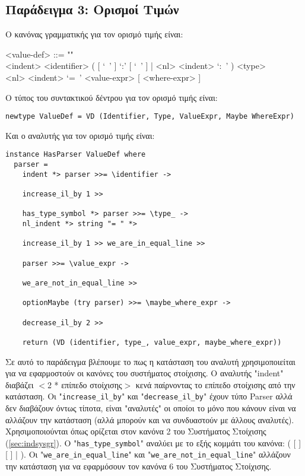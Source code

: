 \documentclass[diploma]{softlab-thesis}
\begin{document}
\newpage

\subsection{Παράδειγμα 3: Ορισμοί Τιμών}

Ο κανόνας γραμματικής για τον ορισμό τιμής είναι:
\begin{grammar}
<value-def> ::= ""\\
<indent> <identifier>
( [ `\ ' ] `:' [ `\ ' ] | <nl> <indent> `:\ ' ) <type>  \\
<nl> <indent> `=\ ' <value-expr> [ <where-expr> ]
\\
\end{grammar}
Ο τύπος του συντακτικού δέντρου για τον ορισμό τιμής είναι:
\begin{verbatim}
newtype ValueDef = VD (Identifier, Type, ValueExpr, Maybe WhereExpr)

\end{verbatim}
Και ο αναλυτής για τον ορισμό τιμής είναι:
\begin{verbatim}
instance HasParser ValueDef where
  parser =
    indent *> parser >>= \identifier ->

    increase_il_by 1 >>

    has_type_symbol *> parser >>= \type_ ->
    nl_indent *> string "= " *>

    increase_il_by 1 >> we_are_in_equal_line >>

    parser >>= \value_expr ->

    we_are_not_in_equal_line >>

    optionMaybe (try parser) >>= \maybe_where_expr ->

    decrease_il_by 2 >>

    return (VD (identifier, type_, value_expr, maybe_where_expr))

\end{verbatim}
Σε αυτό το παράδειγμα βλέπουμε το πως η κατάσταση του αναλυτή χρησιμοποιείται
για να εφαρμοστούν οι κανόνες του συστήματος στοίχισης. Ο αναλυτής "indent"
διαβάζει $<$2 * επίπεδο στοίχισης$>$ κενά παίρνοντας το επίπεδο στοίχισης από
την κατάσταση. Oι "\verb|increase_il_by|" και "\verb|decrease_il_by|" έχουν
τύπο Parser αλλά δεν διαβάζουν όντως τίποτα, είναι "αναλυτές" οι οποίοι
το μόνο που κάνουν είναι να αλλάζουν την κατάσταση (αλλά μπορούν και να
συνδυαστούν με άλλους αναλυτές). Χρησιμοποιούνται όπως ορίζεται στον κανόνα 2
του Συστήματος Στοίχισης (\ref{sec:indsysgr}). Ο "\verb|has_type_symbol|"
αναλύει με το εξής κομμάτι του κανόνα:
( [ \lit{\ } ] \lit{:} [ \lit{\ } ] \verb||| 
 \lit{:\ }). Οι "\verb|we_are_in_equal_line|" και
"\verb|we_are_not_in_equal_line|" αλλάζουν την κατάσταση για να εφαρμόσουν τον
κανόνα 6 του Συστήματος Στοίχισης.
\end{document}
